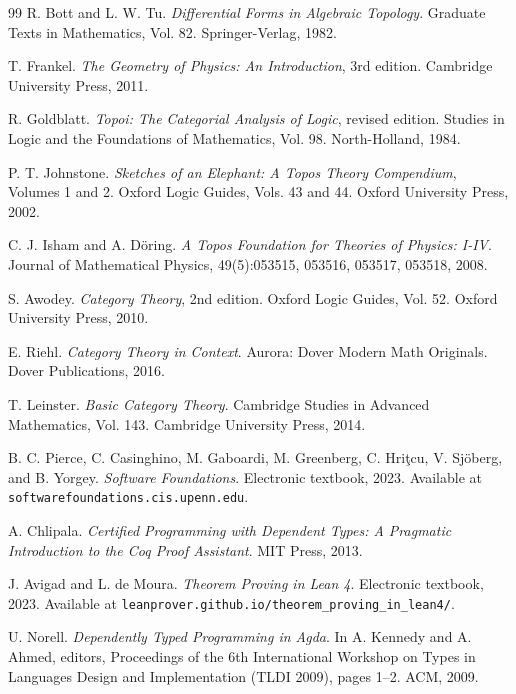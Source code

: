 \documentclass[11pt]{article}
\theoremstyle{definition}
\begin{document}
\begin{thebibliography}{99}
R. Bott and L. W. Tu.
\textit{Differential Forms in Algebraic Topology}.
Graduate Texts in Mathematics, Vol. 82. Springer-Verlag, 1982.

T. Frankel.
\textit{The Geometry of Physics: An Introduction}, 3rd edition.
Cambridge University Press, 2011.

R. Goldblatt.
\textit{Topoi: The Categorial Analysis of Logic}, revised edition.
Studies in Logic and the Foundations of Mathematics, Vol. 98. North-Holland, 1984.

P. T. Johnstone.
\textit{Sketches of an Elephant: A Topos Theory Compendium}, Volumes 1 and 2.
Oxford Logic Guides, Vols. 43 and 44. Oxford University Press, 2002.

C. J. Isham and A. Döring.
\textit{A Topos Foundation for Theories of Physics: I-IV}.
Journal of Mathematical Physics, 49(5):053515, 053516, 053517, 053518, 2008.

S. Awodey.
\textit{Category Theory}, 2nd edition.
Oxford Logic Guides, Vol. 52. Oxford University Press, 2010.

E. Riehl.
\textit{Category Theory in Context}.
Aurora: Dover Modern Math Originals. Dover Publications, 2016.

T. Leinster.
\textit{Basic Category Theory}.
Cambridge Studies in Advanced Mathematics, Vol. 143. Cambridge University Press, 2014.

B. C. Pierce, C. Casinghino, M. Gaboardi, M. Greenberg, C. Hriţcu, V. Sjöberg, and B. Yorgey.
\textit{Software Foundations}.
Electronic textbook, 2023.
Available at \texttt{softwarefoundations.cis.upenn.edu}.

A. Chlipala.
\textit{Certified Programming with Dependent Types: A Pragmatic Introduction to the Coq Proof Assistant}.
MIT Press, 2013.

J. Avigad and L. de Moura.
\textit{Theorem Proving in Lean 4}.
Electronic textbook, 2023.
Available at \texttt{leanprover.github.io/theorem\_proving\_in\_lean4/}.

U. Norell.
\textit{Dependently Typed Programming in Agda}.
In A. Kennedy and A. Ahmed, editors, Proceedings of the 6th International Workshop on Types in Languages Design and Implementation (TLDI 2009), pages 1--2. ACM, 2009.


\end{thebibliography}
\end{document}
